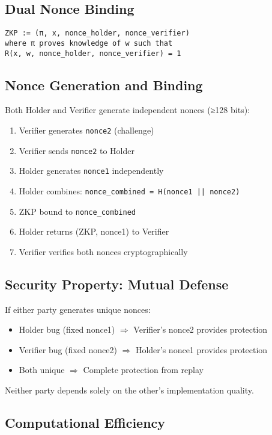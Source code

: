 \subsection{Dual Nonce Binding}

\begin{verbatim}
ZKP := (π, x, nonce_holder, nonce_verifier)
where π proves knowledge of w such that
R(x, w, nonce_holder, nonce_verifier) = 1
\end{verbatim}

\subsection{Nonce Generation and Binding}

Both Holder and Verifier generate independent nonces (≥128 bits):

\begin{enumerate}
  \item Verifier generates \texttt{nonce2} (challenge)
  \item Verifier sends \texttt{nonce2} to Holder
  \item Holder generates \texttt{nonce1} independently
  \item Holder combines: \texttt{nonce\_combined = H(nonce1 || nonce2)}
  \item ZKP bound to \texttt{nonce\_combined}
  \item Holder returns (ZKP, nonce1) to Verifier
  \item Verifier verifies both nonces cryptographically
\end{enumerate}

\subsection{Security Property: Mutual Defense}

If either party generates unique nonces:
\begin{itemize}
  \item Holder bug (fixed nonce1) $\Rightarrow$ Verifier's nonce2 provides protection
  \item Verifier bug (fixed nonce2) $\Rightarrow$ Holder's nonce1 provides protection
  \item Both unique $\Rightarrow$ Complete protection from replay
\end{itemize}

Neither party depends solely on the other's implementation quality.

\subsection{Computational Efficiency}

